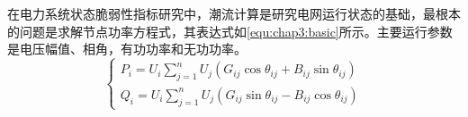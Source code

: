 










在电力系统状态脆弱性指标研究中，潮流计算是研究电网运行状态的基础，最根本的问题是求解节点功率方程式，其表达式如\ref{equ:chap3:basic}所示。主要运行参数是电压幅值、相角，有功功率和无功功率。
\begin{equation}
\label{equ:chap3:basic}
  \left\{\begin{array}{l}{P_{i}=U_{i} \sum_{j=1}^{n} U_{j}\left(G_{i j} \cos \theta_{i j}+B_{i j} \sin \theta_{i j}\right)} \\ 
{Q_{i}=U_{i} \sum_{j=1}^{n} U_{j}\left(G_{i j} \sin \theta_{i j}-B_{i j} \cos \theta_{i j}\right)}\end{array}\right.  
\end{equation}

